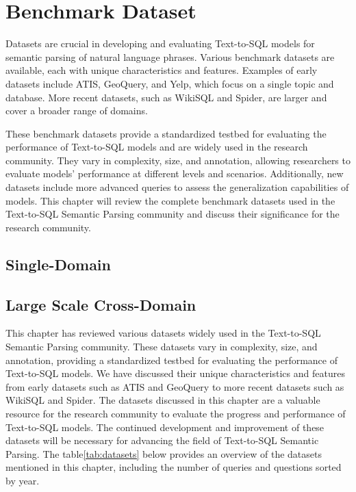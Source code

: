 \section{Benchmark Dataset}

Datasets are crucial in developing and evaluating Text-to-SQL models for semantic parsing of natural language phrases. Various benchmark datasets are available, each with unique characteristics and features. Examples of early datasets include ATIS\cite{dahl-etal-1994-expanding}, GeoQuery\cite{10.1007/3-540-44795-4_40}, and Yelp\cite{10.1145/3133887}, which focus on a single topic and database. More recent datasets, such as WikiSQL\cite{zhong_seq2sql_2017} and Spider\cite{yu_spider_2019}, are larger and cover a broader range of domains.

These benchmark datasets provide a standardized testbed for evaluating the performance of Text-to-SQL models and are widely used in the research community. They vary in complexity, size, and annotation, allowing researchers to evaluate models' performance at different levels and scenarios. Additionally, new datasets include more advanced queries to assess the generalization capabilities of models. This chapter will review the complete benchmark datasets used in the Text-to-SQL Semantic Parsing community and discuss their significance for the research community.

\subsection{Single-Domain}








\clearpage

\subsection{Large Scale Cross-Domain}






This chapter has reviewed various datasets widely used in the Text-to-SQL Semantic Parsing community. These datasets vary in complexity, size, and annotation, providing a standardized testbed for evaluating the performance of Text-to-SQL models. We have discussed their unique characteristics and features from early datasets such as ATIS and GeoQuery to more recent datasets such as WikiSQL and Spider.
The datasets discussed in this chapter are a valuable resource for the research community to evaluate the progress and performance of Text-to-SQL models. The continued development and improvement of these datasets will be necessary for advancing the field of Text-to-SQL Semantic Parsing.
The table\ref{tab:datasets} below provides an overview of the datasets mentioned in this chapter, including the number of queries and questions sorted by year.

